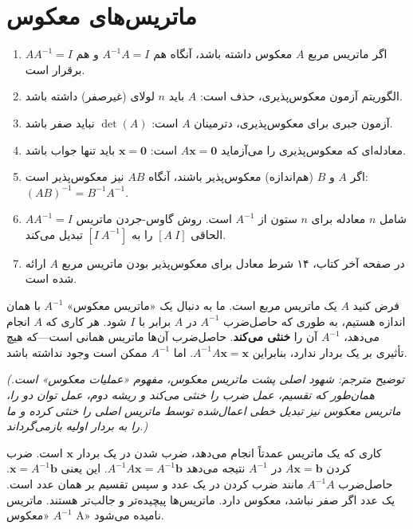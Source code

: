 \documentclass[12pt, a4paper]{book}
\begin{document}
	
	\onehalfspacing
	
	\section{ماتریس‌های معکوس}
	
	\begin{enumerate}[label=\arabic*.]
		\item اگر ماتریس مربع $A$ معکوس داشته باشد، آنگاه هم $A^{-1}A=I$ و هم $AA^{-1}=I$ برقرار است.
		\item الگوریتم آزمون معکوس‌پذیری، حذف است: $A$ باید $n$ لولای (غیرصفر) داشته باشد.
		\item آزمون جبری برای معکوس‌پذیری، دترمینان $A$ است: $\det(A)$ نباید صفر باشد.
		\item معادله‌ای که معکوس‌پذیری را می‌آزماید $A\mathbf{x}=\mathbf{0}$ است: $\mathbf{x}=\mathbf{0}$ باید تنها جواب باشد.
		\item اگر $A$ و $B$ (هم‌اندازه) معکوس‌پذیر باشند، آنگاه $AB$ نیز معکوس‌پذیر است: $(AB)^{-1} = B^{-1}A^{-1}$.
		\item $AA^{-1}=I$ شامل $n$ معادله برای $n$ ستون از $A^{-1}$ است. روش گاوس-جردن ماتریس الحاقی $[A \ I]$ را به $[I \ A^{-1}]$ تبدیل می‌کند.
		\item در صفحه آخر کتاب، ۱۴ شرط معادل برای معکوس‌پذیر بودن ماتریس مربع $A$ ارائه شده است.
	\end{enumerate}
	
	فرض کنید $A$ یک ماتریس مربع است. ما به دنبال یک «ماتریس معکوس» $A^{-1}$ با همان اندازه هستیم، به طوری که حاصل‌ضرب $A^{-1}$ در $A$ برابر با $I$ شود. هر کاری که $A$ انجام می‌دهد، $A^{-1}$ آن را \textbf{خنثی می‌کند}. حاصل‌ضرب آن‌ها ماتریس همانی است—که هیچ تأثیری بر یک بردار ندارد، بنابراین $A^{-1}A\mathbf{x} = \mathbf{x}$. اما $A^{-1}$ ممکن است وجود نداشته باشد.
	
	\textit{(توضیح مترجم: شهود اصلی پشت ماتریس معکوس، مفهوم «عملیات معکوس» است. همان‌طور که تقسیم، عمل ضرب را خنثی می‌کند و ریشه دوم، عمل توان دو را، ماتریس معکوس نیز تبدیل خطی اعمال‌شده توسط ماتریس اصلی را خنثی کرده و ما را به بردار اولیه بازمی‌گرداند.)}
	
	کاری که یک ماتریس عمدتاً انجام می‌دهد، ضرب شدن در یک بردار $\mathbf{x}$ است. ضرب کردن $A\mathbf{x}=\mathbf{b}$ در $A^{-1}$ نتیجه می‌دهد $A^{-1}A\mathbf{x} = A^{-1}\mathbf{b}$. این یعنی $\mathbf{x} = A^{-1}\mathbf{b}$. حاصل‌ضرب $A^{-1}A$ مانند ضرب کردن در یک عدد و سپس تقسیم بر همان عدد است. یک عدد اگر صفر نباشد، معکوس دارد. ماتریس‌ها پیچیده‌تر و جالب‌تر هستند. ماتریس $A^{-1}$ «معکوس A» نامیده می‌شود.
	
\end{document}
